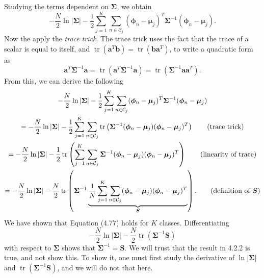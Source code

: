\documentclass[12pt, a4paper]{article}
\newcommand{\vect}[1]{\bm{#1}}
\newcommand{\abs}[1]{\left\lvert#1\right\rvert}
\begin{document}
Studying the terms dependent on $\vect{\Sigma}$, we obtain
\begin{equation*}
	- \frac{N}{2} \ln \abs{\vect{\Sigma}}
	-
	\frac{1}{2}
	\sum_{j=1}^{K} \sum_{n \in \mathcal{C}_j} 
	(\vect{\phi}_n - \vect{\mu}_j)^T 
	\vect{\Sigma}^{-1} 
	(\vect{\phi}_n - \vect{\mu}_j).
\end{equation*}
Now the apply the \emph{trace trick}.
The trace trick uses the fact that the trace of a scalar is equal to itself, and $\operatorname{tr}(\vect{a}^T \vect{b}) = \operatorname{tr}(\vect{b} \vect{a}^T)$, to write a quadratic form as
\begin{equation*}
	\vect{a}^T \vect{\Sigma}^{-1} \vect{a}
	=
	\operatorname{tr}
	\left( \vect{a}^T \vect{\Sigma}^{-1} \vect{a} \right)
	= 
	\operatorname{tr}
	\left( \vect{\Sigma}^{-1} \vect{a}\vect{a}^T \right).
\end{equation*}
From this, we can derive the following
\begin{gather*}
	- \frac{N}{2} \ln \abs{\vect{\Sigma}}
	-
	\frac{1}{2}
	\sum_{j=1}^{K} \sum_{n \in \mathcal{C}_j} 
	(\vect{\phi}_n - \vect{\mu}_j)^T 
	\vect{\Sigma}^{-1} 
	(\vect{\phi}_n - \vect{\mu}_j) 
	\\
	= - \frac{N}{2} \ln \abs{\vect{\Sigma}}
	-
	\frac{1}{2}
	\sum_{j=1}^{K} \sum_{n \in \mathcal{C}_j} 
	\operatorname{tr}
	\left( 
	\vect{\Sigma}^{-1} 
	(\vect{\phi}_n - \vect{\mu}_j)
	(\vect{\phi}_n - \vect{\mu}_j)^T
	 \right) 
	 \tag{trace trick}
	 \\
 	= - \frac{N}{2} \ln \abs{\vect{\Sigma}}
 	-
 	\frac{1}{2}
 	\operatorname{tr}
 	\left( 
 	\sum_{j=1}^{K} \sum_{n \in \mathcal{C}_j} 
 	\vect{\Sigma}^{-1} 
 	(\vect{\phi}_n - \vect{\mu}_j)
 	(\vect{\phi}_n - \vect{\mu}_j)^T
 	\right) 
 	 \tag{linearity of trace} \\
 	= 
 	- \frac{N}{2} \ln \abs{\vect{\Sigma}}
 	-
 	\frac{N}{2}
 	\operatorname{tr}
 	\left( 
 	\vect{\Sigma}^{-1} 
 	\underbrace{
 		\frac{1}{N}
 		\sum_{j=1}^{K} \sum_{n \in \mathcal{C}_j} 
 		(\vect{\phi}_n - \vect{\mu}_j)
 		(\vect{\phi}_n - \vect{\mu}_j)^T}_{\vect{S}}
 	\right) .
 	\tag{definition of $\vect{S}$}
\end{gather*}
We have shown that Equation (4.77) holds for $K$ classes.
Differentiating 
\begin{equation*}
	- \frac{N}{2} \ln \abs{\vect{\Sigma}}
	- \frac{N}{2} \operatorname{tr} \left( \vect{\Sigma}^{-1} \vect{S} \right)
\end{equation*}
with respect to $\vect{\Sigma}$ shows that $\vect{\Sigma}^{-1} = \vect{S}$.
We will trust that the result in 4.2.2 is true, and not show this.
To show it, one must first study the derivative of $\ln \abs{\vect{\Sigma}}$ and $\operatorname{tr} \left( \vect{\Sigma}^{-1} \vect{S} \right)$, and we will do not that here.
\end{document}
